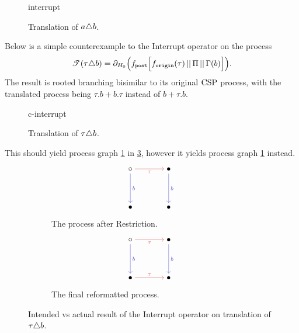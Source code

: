 \documentclass[../hons_project.tex]{subfiles}
\begin{document}
\begin{figure}[H]
	{interrupt}
	\caption{Translation of $a \triangle b$.}
\end{figure}

Below is a simple counterexample to the Interrupt operator on the process
\begin{equation}
	\mathscr{T}(\tau \triangle b) = \partial_{H_{0}}\Bigl(f_{\mathtt{post}}\Bigl[ f_{\mathtt{origin}}(\tau) \,\vert\vert\, \Pi \,\vert\vert\, \Gamma(b) \Bigr]\Bigr).
\end{equation}
The result is rooted branching bisimilar to its original $\mathrm{CSP}$ process, with the translated process being $\tau.b + b.\tau$ instead of $b + \tau.b$.
\begin{figure}[H]
	\centering
	{c-interrupt}
	\caption{Translation of $\tau \triangle b$.}
\end{figure}

This should yield process graph \ref{fig:interrupt-counter-a} in \cref{fig:interrupt-c}, however it yields process graph \ref{fig:interrupt-counter-a} instead.
\begin{multicols}{2}

\end{multicols}

\begin{figure}[!ht]
	\centering
	\begin{subfigure}[b]{0.45\textwidth}
		\[\begin{tikzcd}[cramped, column sep=scriptsize]
				\circ && \bullet \\
				\\
				\bullet && \bullet
				\arrow["\tau"', color={rgb,255:red,214;green,92;blue,92}, from=1-1, to=1-3]
				\arrow["b", color={rgb,255:red,92;green,92;blue,214}, from=1-1, to=3-1]
				\arrow["b", color={rgb,255:red,92;green,92;blue,214}, from=1-3, to=3-3]
			\end{tikzcd}\]
		\caption{The process after Restriction.}
		\label{fig:interrupt-counter-a}
	\end{subfigure}\hfill
	\begin{subfigure}[b]{0.45\textwidth}
		\[\begin{tikzcd}[cramped, column sep=scriptsize]
				\circ && \bullet \\
				\\
				\bullet && \bullet
				\arrow["\tau"', color={rgb,255:red,214;green,92;blue,92}, from=1-1, to=1-3]
				\arrow["b", color={rgb,255:red,92;green,92;blue,214}, from=1-1, to=3-1]
				\arrow["b", color={rgb,255:red,92;green,92;blue,214}, from=1-3, to=3-3]
				\arrow["\tau", color={rgb,255:red,214;green,92;blue,92}, from=3-1, to=3-3]
			\end{tikzcd}\]
		\caption{The final reformatted process.}
		\label{fig:interrupt-counter-b}
	\end{subfigure}
	\caption{Intended vs actual result of the Interrupt operator on translation of $\tau \triangle b$.}
	\label{fig:interrupt-c}
\end{figure}
\end{document}
